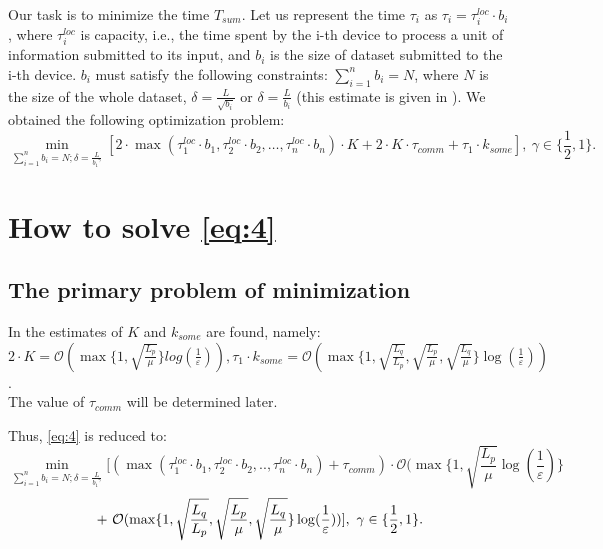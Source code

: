 \documentclass{article}
\begin{document}
Our task is to minimize the time $T_{sum}$. Let us represent the time $\tau_i$ as $\tau_i = \tau_i^{loc}\cdot b_i$, where $\tau_i^{loc}$ is capacity, i.e., the time spent by the i-th device to process a unit of information submitted to its input, and $b_i$ is the size of dataset submitted to the i-th device. $b_i$ must satisfy the following constraints: $\sum\limits_{i = 1}^{n} b_i = N$, where $N$ is the size of the whole dataset, $\delta = \frac{L}{\sqrt{b_i}}$ or $\delta = \frac{L}{b_i}$ (this estimate is given in \cite{kovalev2022optimal}).
We obtained the following optimization problem:
\begin{equation}
    \label{eq:4}
    \underset{\sum\limits_{i = 1}^{n} b_i = N; \delta = \frac{L}{{b_1}^{\gamma}}}{\min}[ 2\cdot\max(\tau_1^{loc}\cdot b_1, \tau_2^{loc}\cdot b_2, \ldots, \tau_n^{loc}\cdot b_n)\cdot K + 2\cdot K\cdot\tau_{comm} + \tau_1\cdot k_{some}], ~ \gamma \in \{\frac{1}{2}, 1\}.
\end{equation}

\section{How to solve \eqref{eq:4}}

\subsection{The primary problem of minimization}
In \cite{kovalev2022optimal} the estimates of $K$ and $k_{some}$ are found, namely: \\ $2\cdot K = \mathcal O(\max\{1, \sqrt{\frac{L_p}{\mu}}\}log(\frac{1}{\varepsilon})), \tau_1\cdot k_{some} = \mathcal O(\max\{1, \sqrt{\frac{L_q}{L_p}}, \sqrt{\frac{L_p}{\mu}}, \sqrt{\frac{L_q}{\mu}}\}\log(\frac{1}{\varepsilon}))$. \\ The value of $\tau_{comm}$ will be determined later. 

Thus, \eqref{eq:4} is reduced to:
\begin{equation}
    \label{eq:5}
    \underset{\sum\limits_{i = 1}^{n} b_i = N; \delta = \frac{L}{{b_1}^\gamma}}{\min}[(\max(\tau_1^{loc}\cdot b_1, \tau_2^{loc}\cdot b_2, . ., \tau_n^{loc}\cdot b_n) + \tau_{comm}) \cdot \mathcal O(\max\{1, \sqrt{\frac{L_p}{\mu}}\log(\frac{1}{\varepsilon})\} 
\end{equation}
\begin{equation}
     \notag
     + ~
    \mathcal O(\max\{1,\sqrt{\frac{L_q}{L_p}}, \sqrt{\frac{L_p}{\mu}}, \sqrt{\frac{L_q}{\mu}}\}\log(\frac{1}{\varepsilon}))] ,  ~ \gamma \in \{\frac{1}{2}, 1\}.
\end{equation}
\end{document}
